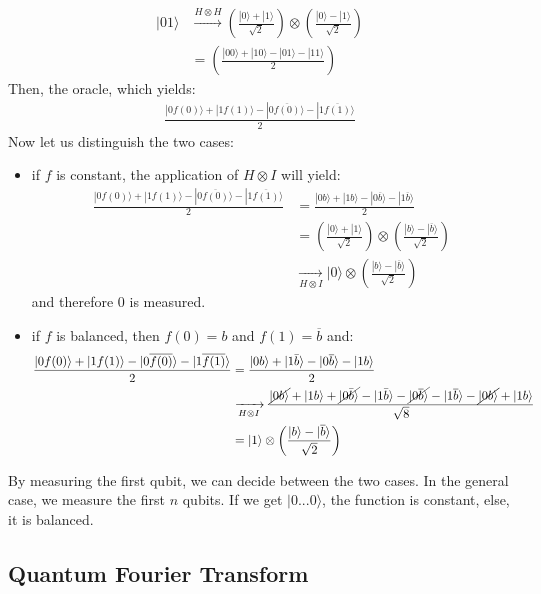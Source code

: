 \documentclass{article}
\begin{document}
\begin{align*}
    |01\rangle &\xrightarrow{H\otimes H} \left(\frac{|0\rangle+|1\rangle}{\sqrt{2}}\right)\otimes \left(\frac{|0\rangle-|1\rangle}{\sqrt{2}}\right)\\
    &= \left(\frac{|00\rangle+|10\rangle-|01\rangle-|11\rangle}{2}\right)
\end{align*}
Then, the oracle, which yields:
\begin{align*}
\frac{|0f(0)\rangle+|1f(1)\rangle-|0\overline{f(0)}\rangle-|1\overline{f(1)}\rangle}{2}
\end{align*}
Now let us distinguish the two cases:
\begin{itemize}
    \item if $f$ is constant, the application of $H\otimes I$ will yield:
\begin{align*}
\frac{|0f(0)\rangle+|1f(1)\rangle-|0\overline{f(0)}\rangle-|1\overline{f(1)}\rangle}{2}
&=\frac{|0b\rangle+|1b\rangle-|0\overline{b}\rangle-|1\overline{b}\rangle}{2}\\
&=\left(\frac{|0\rangle+|1\rangle}{\sqrt{2}}\right)\otimes \left(\frac{|b\rangle-|\overline{b}\rangle}{\sqrt{2}}\right)\\
&\xrightarrow[H\otimes I]{} |0\rangle \otimes \left(\frac{|b\rangle-|\overline{b}\rangle}{\sqrt{2}}\right)
\end{align*}
and therefore $0$ is measured.
\item if $f$ is balanced, then $f(0)=b$ and $f(1)=\overline{b}$ and:
\begin{align*}
\frac{|0f(0)\rangle+|1f(1)\rangle-|0\overline{f(0)}\rangle-|1\overline{f(1)}\rangle}{2}
&=\frac{|0b\rangle+|1\bar{b}\rangle-|0\overline{b}\rangle-|1b\rangle}{2}\\
&\xrightarrow[H\otimes I]{}
    \frac{\cancel{|0b\rangle}+|1b\rangle+\cancel{|0\bar{b}\rangle}-|1\bar{b}\rangle-\cancel{|0\overline{b}\rangle}-|1\overline{b}\rangle-\cancel{|0b\rangle}+|1b\rangle}{\sqrt{8}}\\
&= |1\rangle\otimes\left(\frac{|b\rangle-|\overline{b}\rangle}{\sqrt{2}}\right)
\end{align*}
\end{itemize}

By measuring the first qubit, we can decide between the two cases.
In the general case, we measure the first $n$ qubits. If we get
$|0...0\rangle$, the function is constant, else, it is balanced.

\subsection{Quantum Fourier Transform}
\end{document}
